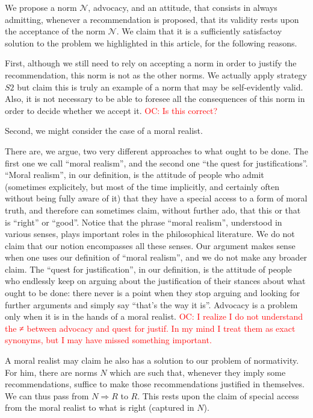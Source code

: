 \documentclass[preprint, french, english, 11pt, authoryear]{elsarticle}%
\newcommand{\commentOC}[1]{\textcolor{red}{OC: #1}}
\newcommand{\adv}{\mathscr{N}}
\begin{document}
We propose a norm $\adv$, advocacy, and an attitude, that consists in always admitting, whenever a recommendation is proposed, that its validity rests upon the acceptance of the norm $\adv$. We claim that it is a sufficiently satisfactoy solution to the problem we highlighted in this article, for the following reasons.

First, although we still need to rely on accepting a norm in order to justify the recommendation, this norm is not as the other norms. We actually apply strategy $S2$ but claim this is truly an example of a norm that may be self-evidently valid. Also, it is not necessary to be able to foresee all the consequences of this norm in order to decide whether we accept it. \commentOC{Is this correct?}

Second, we might consider the case of a moral realist.

There are, we argue, two very different approaches to what ought to be done. The first one we call ``moral realism'', and the second one ``the quest for justifications''.
``Moral realism'', in our definition, is the attitude of people who admit (sometimes explicitely, but most of the time implicitly, and certainly often without being fully aware of it) that they have a special access to a form of moral truth, and therefore can sometimes claim, without further ado, that this or that is ``right'' or ``good''. Notice that the phrase ``moral realism'', understood in various senses, plays important roles in the philosophical literature. We do not claim that our notion encompasses all these senses. Our argument makes sense when one uses our definition of ``moral realism'', and we do not make any broader claim. The ``quest for justification'', in our definition, is the attitude of people who endlessly keep on arguing about the justification of their stances about what ought to be done: there never is a point when they stop arguing and looking for further arguments and simply say ``that's the way it is''. Advocacy is a problem only when it is in the hands of a moral realist.
\commentOC{I realize I do not understand the ≠ between advocacy and quest for justif. In my mind I treat them as exact synonyms, but I may have missed something important.} 

A moral realist may claim he also has a solution to our problem of normativity. For him, there are norms $N$ which are such that, whenever they imply some recommendations, suffice to make those recommendations justified in themselves. We can thus pass from $N ⇒ R$ to $R$. This rests upon the claim of special access from the moral realist to what is right (captured in $N$).
\end{document}

